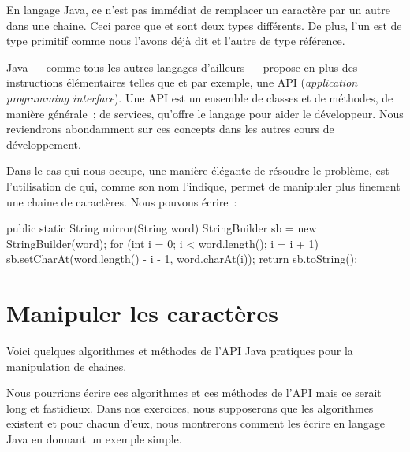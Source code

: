 	En langage Java, ce n'est pas immédiat de remplacer un caractère par un
	autre dans une chaine. Ceci parce que  et  sont
	deux types différents. De plus, l'un est de type primitif comme nous l'avons
	déjà dit et l'autre de type référence. 


	Java — comme tous les autres langages d'ailleurs — propose en plus des
	instructions élémentaires telles que  et  par exemple, une
	API (\textit{application programming interface}). Une API est un ensemble de
	classes et de méthodes, de manière générale~; de services, qu'offre le
	langage pour aider le développeur. Nous reviendrons abondamment sur ces
	concepts dans les autres cours de développement. 

	Dans le cas qui nous occupe, une manière élégante de résoudre le problème,
	est l'utilisation de  qui, comme son nom l'indique, permet
	de manipuler plus finement une chaine de caractères. 
	Nous pouvons écrire~:

	\begin{java}
public static String mirror(String word){
	StringBuilder sb = new StringBuilder(word);
	for (int i = 0; i < word.length(); i = i + 1){
		sb.setCharAt(word.length() - i - 1, word.charAt(i));
	}
	return sb.toString();
}
	\end{java}
	

\section{Manipuler les caractères}

	Voici quelques algorithmes et méthodes de l'API Java  pratiques 
	pour la manipulation de chaines. 

	Nous pourrions écrire ces algorithmes et ces méthodes de l'API mais ce serait
	long et fastidieux. Dans nos exercices, nous supposerons que les algorithmes
	existent et pour chacun d'eux, nous montrerons comment les écrire en langage
	Java en donnant un exemple simple. 
	
